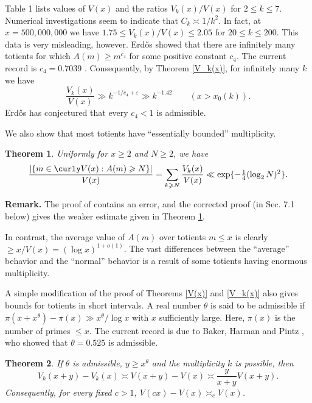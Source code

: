 \documentclass[11pt]{amsart}
\theoremstyle{remark}
\theoremstyle{plain}
\newtheorem{thm}{Theorem}
\numberwithin{equation}{section}
\newcommand{\e}{\ensuremath{\varepsilon}}
\renewcommand{\(}{\left(}
\renewcommand{\)}{\right)}
\newcommand{\fancyV}{\curly V}
\renewcommand{\le}{\leqslant}
\renewcommand{\ge}{\geqslant}
\newcommand{\order}{\asymp}
\begin{document}
Table 1 lists values of $V(x)$ and the ratios $V_k(x)/V(x)$ for
$2\le k\le 7$.
Numerical investigations seem to
indicate that $C_k \order 1/k^2$.   In fact,
 at $x=500,000,000$ we have
$1.75 \le V_k(x)/V(x)  \le 2.05$ for $20\le k\le 200$.
This data is very misleading, however. 
Erd\H os \cite{E1} showed that there are infinitely many totients for which
$A(m) \ge m^{c_4}$
for some positive constant $c_4$.  The current record is
$c_4=0.7039$ \cite{BH}.  Consequently, by 
Theorem \ref{V_k(x)},  for infinitely many $k$ we have
$$
\frac{V_k(x)}{V(x)} \gg k^{-1/c_4+\e} \gg k^{-1.42} \qquad (x>x_0(k)).
$$
Erd\H os
has conjectured that every $c_4<1$ is admissible.



We also show that most totients have ``essentially bounded'' multiplicity.

\begin{thm}\label{A(m) bounded}
Uniformly for $x\ge 2$ and $N\ge 2$, we have
$$
\frac{| \{ m\in \fancyV(x) : A(m)\ge N \}| }{V(x)} =
\sum_{k\ge N} \frac{V_k(x)}{V(x)} \ll \exp\{ - \tfrac14 (\log_2 N)^2 \}.
$$
\end{thm}

{\bf Remark.}  The proof of \cite[Theorem 3]{F98} contains an error, and the corrected
proof (in Sec. 7.1 below) gives the weaker estimate given in  Theorem \ref{A(m) bounded}.


In contrast, the average value of $A(m)$ over totients $m\le x$
is clearly $\ge x/V(x) = (\log x)^{1+o(1)}$.
The vast differences between the ``average'' behavior and the
``normal'' behavior is a result of some
totients having enormous multiplicity.



A simple modification of the proof of Theorems \ref{V(x)} and \ref{V_k(x)}
also gives bounds for totients in short intervals.  A real number $\theta$ is
said to be admissible if $\pi(x+x^\theta)-\pi(x) \gg x^\theta/\log x$
 with $x$ sufficiently large.  Here, $\pi(x)$ is the number of primes $\le x$.
 The current record is due to Baker,
Harman and Pintz \cite{BHP}, who showed that $\theta=0.525$ is admissible.

\begin{thm}\label{short interval}
If $\theta$ is admissible, $y\ge x^\theta$
and the multiplicity $k$ is possible, then
$$
V_k(x+y) - V_k(x) \order V(x+y)-V(x) \order \frac{y}{x+y} V(x+y).
$$
Consequently, for every fixed $c>1$, $V(cx)-V(x) \order_c V(x)$.
\end{thm}
\end{document}
